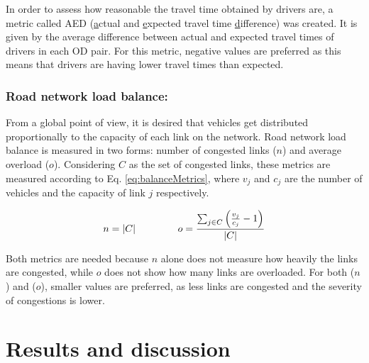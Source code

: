 \documentclass{RITA}
\newcommand{\linkCap}{\ensuremath{c_j}}		%
\newcommand{\veh}{\ensuremath{v}}		%
\newcommand{\congRoads}{\ensuremath{C}}		%
\newcommand{\numCong}{\ensuremath{n}}		%
\newcommand{\overLoadFactor}{\ensuremath{o}}	%
\begin{document}
In order to assess how reasonable the travel time obtained by drivers are, a metric called AED (\underline{a}ctual and \underline{e}xpected travel time \underline{d}ifference) was created. It is given by the average difference between actual and expected travel times of drivers in each OD pair. For this metric, negative values are preferred as this means that drivers are having lower travel times than expected. %

\subsubsection{Road network load balance:}
\label{sec:loadBalanceMetrics}
From a global point of view, it is desired that vehicles get distributed proportionally to the capacity of each link on the network. Road network load balance is measured in two forms: number of congested links ($n$) and average overload ($o$). Considering $C$ as the set of congested links, these metrics are measured according to Eq. \eqref{eq:balanceMetrics}, where $\veh_j$ and $\linkCap$ are the number of vehicles and the capacity of link $j$ respectively. 

\begin{equation}
\label{eq:balanceMetrics}
\numCong = |\congRoads| \hspace{1.5cm}  \overLoadFactor = \frac{ \sum_{\substack{j \in \congRoads}} \left(\frac{\veh_j}{\linkCap} -1 \right)}{|C|}
\end{equation}

Both metrics are needed because $n$ alone does not measure how heavily the links are congested, while $o$ does not show how many links are overloaded. For both ($n$) and ($o$), smaller values are preferred, as less links are congested and the severity of congestions is lower.

\section{Results and discussion}
\label{sec:results}
\end{document}
